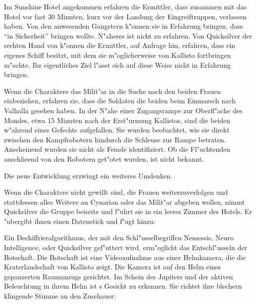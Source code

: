 Im Sunshine Hotel angekommen erfahren die Ermittler, dass \xl{} zusammen mit \ml{} das Hotel vor fast 30 Minuten, kurz vor der Landung der Eingreiftruppen, verlassen haben. Von den anwesenden Gangstern k"onnen sie in Erfahrung bringen, dass \xl{} \ml{} ``in Sicherheit'' bringen wollte. N"aheres ist nicht zu erfahren. Von Quicksilver der rechten Hand von \xl{} k"onnen die Ermittler, auf Anfrage hin, erfahren, dass \xl{} ein eigenes Schiff besitzt, mit dem sie m"oglicherweise \ml{} von Kallisto fortbringen m"ochte. Ihr eigentliches Ziel l"asst sich auf diese Weise nicht in Erfahrung bringen. 

Wenn die Charaktere das Milit"ar in die Suche nach den beiden Frauen einbeziehen, erfahren sie, dass die Soldaten die beiden beim Einmarsch nach Valhalla gesehen haben. In der N"ahe einer Zugangsrampe zur Oberfl"ache des Mondes, etwa 15 Minuten nach der Erst"urmung Kallistos, sind die beiden w"ahrend eines Gefechts aufgefallen. Sie wurden beobachtet, wie sie direkt zwischen den Kampfrobotern hindurch die Schleuse zur Rampe betraten. Anscheinend wurden sie nicht als Feinde identifiziert. Ob die Fl"uchtenden anschlie\3end von den Robotern get"otet wurden, ist nicht bekannt.

Die neue Entwicklung erzwingt ein weiteres Umdenken.

Wenn die Charaktere nicht gewillt sind, die Frauen weiterzuverfolgen und stattdessen alles Weitere an Cynarian oder das Milit"ar abgeben wollen, nimmt Quicksilver die Gruppe beiseite und f"uhrt sie in ein leeres Zimmer des Hotels. Er "ubergibt ihnen einen Datenstick und f"ugt hinzu: 


Ein Dechiffrieralgorithmus, der mit den Schl"usselbegriffen Nemessis, Neuro Intelligence, \xl{} oder Quicksilver gef"uttert wird, erm"oglicht das Entschl"usseln der Botschaft. Die Botschaft ist eine Videoaufnahme aus einer Helmkamera, die die Kraterlandschaft von Kallisto zeigt. Die Kamera ist auf den Helm eines gepanzerten Raumanzugs gerichtet. Im Schein des Jupiters und der aktiven Beleuchtung in ihrem Helm ist \xl{}s Gesicht zu erkennen. Sie richtet ihre blechern klingende Stimme an den Zuschauer:

